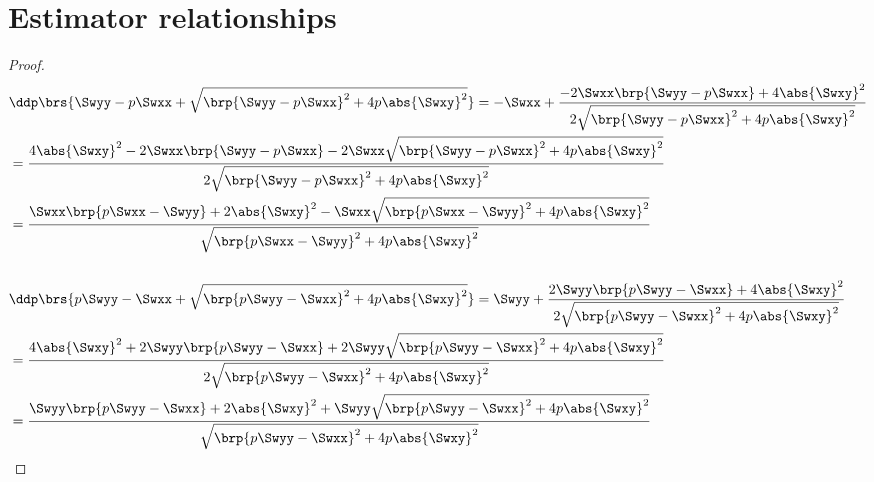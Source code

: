 \section{Estimator relationships}
\begin{lemma}
\label{lem:Hs_ddp}
\end{lemma}
\begin{proof}
  \begin{align*}
      &\ddp\brs{\Swyy-p\Swxx + \sqrt{\brp{\Swyy-p\Swxx }^2 + 4 p \abs{\Swxy}^2}}
      = -\Swxx  + \frac{-2\Swxx\brp{\Swyy-p\Swxx}   + 4 \abs{\Swxy}^2}
                        {2\sqrt{\brp{\Swyy-p\Swxx}^2 + 4p\abs{\Swxy}^2}}
    \\&= \frac{4 \abs{\Swxy }^2 -2\Swxx\brp{\Swyy-p\Swxx} - 2\Swxx\sqrt{\brp{\Swyy-p\Swxx }^2 + 4p\abs{\Swxy}^2}}
              {2\sqrt{\brp{\Swyy-p\Swxx }^2 + 4p\abs{\Swxy}^2}}
    \\&= \frac{\Swxx\brp{p\Swxx-\Swyy} + 2 \abs{\Swxy }^2 -  \Swxx\sqrt{\brp{p\Swxx-\Swyy}^2 + 4p\abs{\Swxy}^2}}
              {\sqrt{\brp{p\Swxx-\Swyy}^2 + 4p\abs{\Swxy}^2}}
    \\\\
      &\ddp\brs{p\Swyy-\Swxx + \sqrt{\brp{p\Swyy-\Swxx }^2 + 4 p \abs{\Swxy}^2}}
       = \Swyy  + \frac{2\Swyy\brp{p\Swyy-\Swxx}   + 4 \abs{\Swxy}^2}
                        {2\sqrt{\brp{p\Swyy-\Swxx}^2 + 4p\abs{\Swxy}^2}}
    \\&= \frac{4 \abs{\Swxy }^2 +2\Swyy\brp{p\Swyy-\Swxx} + 2\Swyy\sqrt{\brp{p\Swyy-\Swxx }^2 + 4p\abs{\Swxy}^2}}
              {2\sqrt{\brp{p\Swyy-\Swxx }^2 + 4p\abs{\Swxy}^2}}
    \\&= \frac{\Swyy\brp{p\Swyy-\Swxx} + 2 \abs{\Swxy }^2 +  \Swyy\sqrt{\brp{p\Swyy-\Swxx}^2 + 4p\abs{\Swxy}^2}}
              {\sqrt{\brp{p\Swyy-\Swxx}^2 + 4p\abs{\Swxy}^2}}
  \end{align*}
\end{proof}

